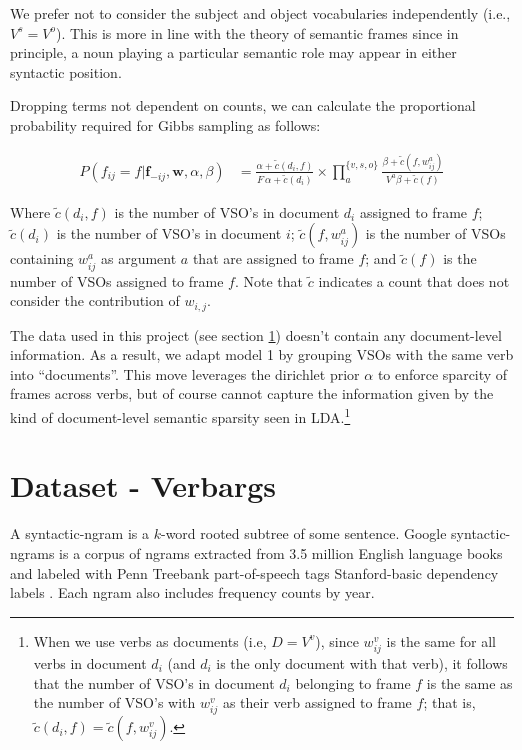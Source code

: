 \documentclass{article} %
\begin{document}
We prefer not to consider the subject and object vocabularies independently 
(i.e., $V^s = V^o$). This is more in line with the theory of semantic frames 
since in principle, a noun playing a particular semantic role may appear in either 
syntactic position.

Dropping terms not dependent on counts, we can calculate the proportional
probability required for Gibbs sampling as follows:

\begin{align}
P(f_{ij} = f|\mathbf{f}_{-ij},\mathbf{w}, \alpha,\beta)
&=\frac{\alpha + \tilde c(d_i,f)}{F\,\alpha + \tilde c(d_i)}
\times \prod_a^{\{v,s,o\}}\frac{\beta+\tilde c(f,w_{ij}^a)}{V^a\beta+\tilde c(f)}
\end{align}

Where $\tilde c (d_i, f)$ is the number of VSO's in document $d_i$ assigned to frame $f$;
$\tilde c(d_i)$ is the number of VSO's in document $i$;
$\tilde c(f,w_{ij}^a)$ is the number of VSOs containing $w_{ij}^a$ as argument $a$ that are
assigned to frame $f$; and
$\tilde c(f)$ is the number of VSOs assigned to frame $f$.
Note that $\tilde c$ indicates a count that does not consider the contribution of 
$w_{i,j}$.

The data used in this project (see section \ref{data}) doesn't contain any document-level
information. As a result, we adapt model 1 by grouping VSOs with the same verb into ``documents''.
This move leverages the dirichlet prior $\alpha$ to enforce sparcity of frames 
across verbs, but of course cannot capture the information given by the kind of
document-level semantic sparsity seen in LDA.\footnote{When we use verbs as
documents (i.e, $D = V^v$), since $w_{ij}^v$ is the same for all verbs in document $d_i$ 
(and $d_i$ is the only document with that verb), it follows that the number of VSO's in document 
$d_i$ belonging to frame $f$ is the same as the number of VSO's with $w_{ij}^v$ as their verb assigned to 
frame $f$; that is, $\tilde c(d_i, f) = \tilde c(f, w_{ij}^v)$.}

\section{Dataset - Verbargs}
\label{data}

A syntactic-ngram is a $k$-word rooted subtree of some sentence.
Google syntactic-ngrams is a corpus of ngrams extracted from 3.5 million English language 
books and labeled with Penn Treebank part-of-speech tags Stanford-basic dependency 
labels \citep{ngrams2013}.
Each ngram also includes frequency counts by year.
\end{document}
